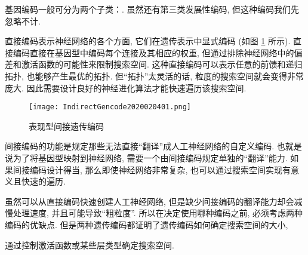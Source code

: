 基因编码一般可分为两个子类：.
虽然还有第三类发展性编码, 但这种编码我们先忽略不计.

 直接编码表示神经网络的各个方面, 它们在遗传表示中显式编码 (如图 \ref{IndirectGencode2020020401} 所示).
直接编码直接在基因型中编码每个连接及其相应的权重, 但通过排除神经网络中的偏差和激活函数的可能性来限制搜索空间.
这种直接编码可以表示任意的前馈和递归拓扑, 也能够产生最优的拓扑. 但“拓扑”太灵活的话, 粒度的搜索空间就会变得非常庞大.
因此需要设计良好的神经进化算法才能快速遍历该搜索空间.
\begin{figure}[H]
    \centering
    \texttt{[image: IndirectGencode2020020401.png]}
    \caption{表现型间接遗传编码}
    \label{IndirectGencode2020020401}
\end{figure}

 间接编码的功能是规定那些无法直接“翻译”成人工神经网络的自定义编码.
也就是说为了将基因型映射到神经网络, 需要一个由间接编码规定单独的“翻译”能力.
如果间接编码设计得当, 那么即使神经网络非常复杂, 也可以通过搜索空间实现有意义且快速的遍历.

虽然可以从直接编码快速创建人工神经网络, 但是缺少间接编码的翻译能力却会减慢处理速度, 并且可能导致“粗粒度”.
所以在决定使用哪种编码之前, 必须考虑两种编码的优缺点.
但是两种遗传编码都证明了遗传编码如何确定搜索空间的大小,
\begin{example}
    通过控制激活函数或某些层类型确定搜索空间.
\end{example}



